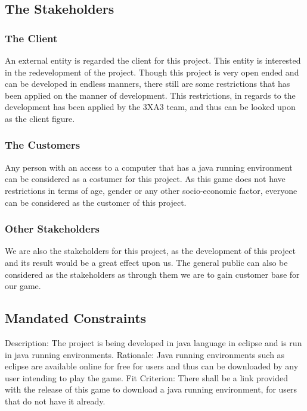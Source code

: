 \documentclass[12pt,letterpaper]{article}
\begin{document}
	
	\subsection{The Stakeholders}
	\subsubsection{The Client}
	An external entity is regarded the client for this project. This entity is interested in the redevelopment of the project. Though this project is very open ended and can be developed in endless manners, there still are some restrictions that has been applied on the manner of development. This restrictions, in regards to the development has been applied by the 3XA3 team, and thus can be looked upon as the client figure.\\
			
	\subsubsection{The Customers}
	Any person with an access to a computer that has a java running environment can be considered as a costumer for this project. As this game does not have restrictions in terms of age, gender or any other socio-economic factor, everyone can be considered as the customer of this project.\\

	\subsubsection{Other Stakeholders}
	We are also the stakeholders for this project, as the development of this project and its result would be a great effect upon us. The general public can also be considered as the stakeholders as through them we are to gain customer base for our game.
	
	\subsection{Mandated Constraints}
	Description: The project is being developed in java language in eclipse and is run in java running environments.
Rationale: Java running environments such as eclipse are available online for free for users and thus can be downloaded by any user intending to play the game.
Fit Criterion: There shall be a link provided with the release of this game to download a java running environment, for users that do not have it already.\\
\end{document}
